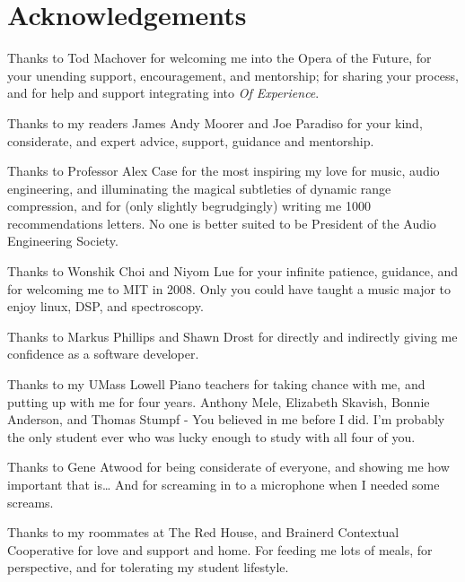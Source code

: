 \clearpage
\chapter*{Acknowledgements}
\label{ch:acknowledgements}
\begin{fullwidth}
\noindent Thanks to Tod Machover for welcoming me into the Opera of
the Future, for your unending support, encouragement, and mentorship; 
for sharing your process, and for help and support
integrating \thesis into \textit{Of Experience}.

\vspace{5mm}
\noindent Thanks to my readers James Andy Moorer and Joe Paradiso for
your kind, considerate, and expert advice, support, guidance and mentorship.

\vspace{5mm}
\noindent Thanks to Professor Alex Case for the most inspiring my love
for music, audio engineering, and illuminating the magical subtleties
of dynamic range compression, and for (only slightly begrudgingly)
writing me 1000 recommendations letters. No one is better suited to be
President of the Audio Engineering Society.

\vspace{5mm}
\noindent Thanks to Wonshik Choi and Niyom Lue for your infinite
patience, guidance, and for welcoming me to MIT in 2008. Only you
could have taught a music major to enjoy linux, DSP, and spectroscopy.

\vspace{5mm}
\noindent Thanks to Markus Phillips and Shawn Drost for directly and indirectly
giving me confidence as a software developer.

\vspace{5mm}
\noindent Thanks to my UMass Lowell Piano teachers for taking chance with me,
and putting up with me for four years. Anthony Mele, Elizabeth
Skavish, Bonnie Anderson, and Thomas Stumpf - You believed in me
before I did. I'm probably the only student ever who was lucky enough
to study with all four of you.

\vspace{5mm}
\noindent  Thanks to Gene Atwood for being considerate of everyone, and showing
me how important that is\ldots{} And for screaming in to a microphone when
I needed some screams.

\vspace{5mm}
\noindent Thanks to my roommates at The Red House, and Brainerd
Contextual Cooperative for love and support and home. For feeding me
lots of meals, for perspective, and for tolerating my student
lifestyle.


\end{fullwidth}
